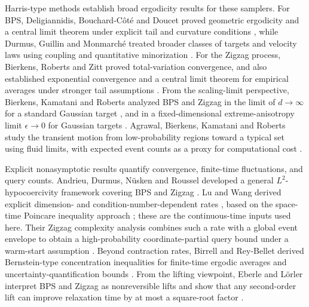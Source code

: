 \documentclass{amsart}
\theoremstyle{plain}
\theoremstyle{definition}
\theoremstyle{remark}
\newcommand{\1}{\mathbf 1}
\begin{document}
Harris-type methods establish broad ergodicity results for these samplers.
For BPS, Deligiannidis, Bouchard-C\^ot\'e and Doucet proved geometric
ergodicity and a central limit theorem under explicit tail and curvature
conditions \cite{DeligiannidisBouchardCoteDoucet2019}, while Durmus, Guillin
and Monmarch\'e treated broader classes of targets and velocity laws using
coupling and quantitative minorization
\cite{DurmusGuillinMonmarche2020}.  For the Zigzag process,
Bierkens, Roberts and Zitt proved total-variation convergence, and also established exponential convergence and a central limit theorem for empirical averages under stronger tail assumptions \cite{BierkensRobertsZitt2019}. 
From the scaling-limit perspective, Bierkens, Kamatani and Roberts analyzed BPS
and Zigzag in the limit of $d \to \infty$ for a standard Gaussian target
\cite{BierkensKamataniRoberts2022}, and in a fixed-dimensional
extreme-anisotropy limit $\epsilon \to 0$ for Gaussian targets
\cite{BierkensKamataniRoberts2025}.  Agrawal,
Bierkens, Kamatani and Roberts study the transient motion from low-probability
regions toward a typical set using fluid limits, with expected event counts as
a proxy for computational cost
\cite{AgrawalBierkensKamataniRoberts2025}.  

Explicit nonasymptotic results quantify convergence, finite-time fluctuations,
and query counts.  Andrieu, Durmus, N\"usken and Roussel developed a general
$L^2$-hypocoercivity framework covering BPS and Zigzag
\cite{AndrieuDurmusNueskenRoussel2021}.  Lu and Wang derived explicit
dimension- and condition-number-dependent rates \cite{LuWangPDMP}, based on the space-time Poincare inequality approach \cite{CaoLuWangUnderdamped}; these are
the continuous-time inputs used here.  Their Zigzag complexity analysis
combines such a rate with a global event envelope to obtain a high-probability
coordinate-partial query bound under a warm-start assumption
\cite{LuWangZigzag}.  Beyond contraction rates,
Birrell and Rey-Bellet derived Bernstein-type concentration inequalities for
finite-time ergodic averages and uncertainty-quantification bounds
\cite{BirrellReyBellet2019}.  From the lifting viewpoint, Eberle and L\"orler interpret BPS and Zigzag as nonreversible lifts and show that any second-order lift can improve relaxation time by at most a square-root factor \cite{EberleLorlerLifts}.
\end{document}
